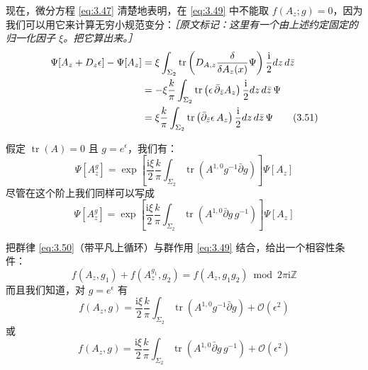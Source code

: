 现在，微分方程 \eqref{eq:3.47} 清楚地表明，在 \eqref{eq:3.49} 中不能取 $f(A_{z};g)=0$，因为我们可以用它来计算无穷小规范变分：{\small\itshape ［原文标记：这里有一个由上述约定固定的归一化因子 $\xi$。把它算出来。］}
\begin{align}
  \Psi[A_{z}+D_{z}\epsilon]-\Psi[A_{z}]
  &=\xi\int_{\Sigma_2}\operatorname{tr}\left(D_{A,z}\frac{\delta}{\delta A_{z}(x)}\Psi\right)\frac{\mathrm{i}}{2}dz\,d\bar z\notag\\
  &=-\xi\frac{k}{\pi}\int_{\Sigma_2}\operatorname{tr}\left(\epsilon\,\bar\partial_{\bar z}A_{z}\right)\frac{\mathrm{i}}{2}dz\,d\bar z\,\Psi\notag\\
  &=\xi\frac{k}{\pi}\int_{\Sigma_2}\operatorname{tr}\left(\bar\partial_{\bar z}\epsilon\,A_{z}\right)\frac{\mathrm{i}}{2}dz\,d\bar z\,\Psi
  \tag{3.51}
  \label{eq:3.51}
\end{align}

假定 $\operatorname{tr}(A)=0$ 且 $g=e^{\epsilon}$，我们有：
\begin{equation}
  \Psi[A^{g}_{z}]=\exp\left[\frac{\mathrm{i}\xi}{2}\frac{k}{\pi}\int_{\Sigma_2}\operatorname{tr}\left(A^{1,0}g^{-1}\bar\partial g\right)\right]\Psi[A_{z}]
  \tag{3.52}
  \label{eq:3.52}
\end{equation}
尽管在这个阶上我们同样可以写成
\begin{equation}
  \Psi[A^{g}_{z}]=\exp\left[\frac{\mathrm{i}\xi}{2}\frac{k}{\pi}\int_{\Sigma_2}\operatorname{tr}\left(A^{1,0}\bar\partial g\,g^{-1}\right)\right]\Psi[A_{z}]
  \tag{3.53}
  \label{eq:3.53}
\end{equation}

把群律 \eqref{eq:3.50}（带平凡上循环）与群作用 \eqref{eq:3.49} 结合，给出一个相容性条件：
\begin{equation}
  f(A_{z},g_{1})+f(A^{g_{1}}_{z},g_{2})=f(A_{z},g_{1}g_{2})\bmod 2\pi\mathrm{i}\mathbb{Z}
  \tag{3.54}
  \label{eq:3.54}
\end{equation}
而且我们知道，对 $g=e^{\epsilon}$ 有
\begin{equation}
  f(A_{z},g)=\frac{\mathrm{i}\xi}{2}\frac{k}{\pi}\int_{\Sigma_2}\operatorname{tr}\left(A^{1,0}g^{-1}\bar\partial g\right)+\mathcal{O}(\epsilon^{2})
  \tag{3.55}
  \label{eq:3.55}
\end{equation}
或
\begin{equation}
  f(A_{z},g)=\frac{\mathrm{i}\xi}{2}\frac{k}{\pi}\int_{\Sigma_2}\operatorname{tr}\left(A^{1,0}\bar\partial g\,g^{-1}\right)+\mathcal{O}(\epsilon^{2})
  \tag{3.56}
  \label{eq:3.56}
\end{equation}

